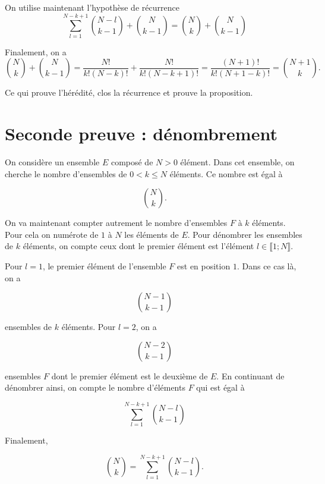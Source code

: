 \documentclass{article}
\begin{document}
On utilise maintenant l'hypothèse de récurrence
\begin{equation*}
\sum_{l=1}^{N-k+1} {N-l \choose k-1} + {N \choose k-1} = {N \choose k}+ {N \choose k-1}
\end{equation*}

Finalement, on a
\begin{equation*}
{N \choose k}+ {N \choose k-1}= \frac{N!}{k!(N-k)!} + \frac{N!}{k!(N-k+1)!} = \frac{(N+1)!}{k!(N+1-k)!} = {N+1 \choose k}.
\end{equation*}

Ce qui prouve l'hérédité, clos la récurrence et prouve la proposition.

\section{Seconde preuve :  dénombrement}

On considère un ensemble $E$ composé de $N>0$ élément. Dans cet ensemble, on cherche le nombre d'ensembles de $0<k\leq N$ éléments. Ce nombre est égal à

\begin{equation*}
{N \choose k}.
\end{equation*}

On va maintenant compter autrement le nombre d'ensembles $F$ à $k$ éléments. Pour cela on numérote de $1$ à $N$ les éléments de $E$. Pour dénombrer les ensembles de $k$ éléments, on compte ceux dont le premier élément est l'élément $l \in  \llbracket 1;N \rrbracket$.

Pour $l=1$, le premier élément de l'ensemble $F$ est en position $1$. Dans ce cas là, on a 

\begin{equation*}
{N-1 \choose k-1}
\end{equation*}

ensembles de $k$ éléments. Pour $l=2$, on a 

\begin{equation*}
{N-2 \choose k-1}
\end{equation*}

ensembles $F$ dont le premier élément est le deuxième de $E$. En continuant de dénombrer ainsi, on compte le nombre d'éléments $F$ qui est égal à

\begin{equation*}
\sum_{l=1}^{N-k+1} {N-l \choose k-1}
\end{equation*}

Finalement,

\begin{equation*}
{N \choose k} = \sum_{l=1}^{N-k+1} {N-l \choose k-1}.
\end{equation*}
\end{document}
